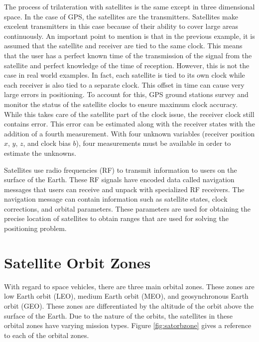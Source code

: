 \documentclass[12pt]{report}
\begin{document}
The process of trilateration with satellites is the same except in three dimensional space. In the case of GPS, the satellites are the transmitters. Satellites make excelent transmitters in this case because of their ability to cover large areas continuously. An important point to mention is that in the previous example, it is assumed that the satellite and receiver are tied to the same clock. This means that the user has a perfect known time of the transmission of the signal from the satellite and perfect knowledge of the time of reception. However, this is not the case in real world examples. In fact, each satellite is tied to its own clock while each receiver is also tied to a separate clock. This offset in time can cause very large errors in positioning. To account for this, GPS ground stations survey and monitor the status of the satellite clocks to ensure maximum clock accuracy. While this takes care of the satellite part of the clock issue, the receiver clock still contains error. This error can be estimated along with the receiver states with the addition of a fourth measurement. With four unknown variables (receiver position $x$, $y$, $z$, and clock bias $b$), four measurements must be available in order to estimate the unknowns. 

Satellites use radio frequencies (RF) to transmit information to users on the surface of the Earth. These RF signals have encoded data called navigation messages that users can receive and unpack with specialized RF receivers. The navigation message can contain information such as satellite states, clock corrections, and orbital parameters. These parameters are used for obtaining the precise location of satellites to obtain ranges that are used for solving the positioning problem. 

\section{Satellite Orbit Zones}

With regard to space vehicles, there are three main orbital zones. These zones are low Earth orbit (LEO), medium Earth orbit (MEO), and geosynchronous Earth orbit (GEO). These zones are differentiated by the altitude of the orbit above the surface of the Earth. Due to the nature of the orbits, the satellites in these orbital zones have varying mission types. Figure \ref{fig:satorbzone} gives a reference to each of the orbital zones. 
\end{document}
